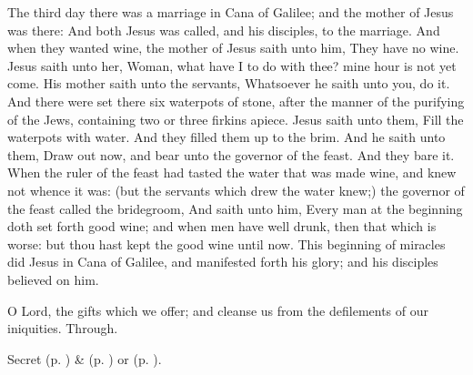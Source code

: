  The third day there was a marriage in Cana of Galilee; and the mother of Jesus was there: And both Jesus was called, and his disciples, to the marriage. And when they wanted wine, the mother of Jesus saith unto him, They have no wine. Jesus saith unto her, Woman, what have I to do with thee? mine hour is not yet come. His mother saith unto the servants, Whatsoever he saith unto you, do it. And there were set there six waterpots of stone, after the manner of the purifying of the Jews, containing two or three firkins apiece. Jesus saith unto them, Fill the waterpots with water. And they filled them up to the brim. And he saith unto them, Draw out now, and bear unto the governor of the feast. And they bare it. When the ruler of the feast had tasted the water that was made wine, and knew not whence it was: (but the servants which drew the water knew;) the governor of the feast called the bridegroom, And saith unto him, Every man at the beginning doth set forth good wine; and when men have well drunk, then that which is worse: but thou hast kept the good wine until now. This beginning of miracles did Jesus in Cana of Galilee, and manifested forth his glory; and his disciples believed on him.


\vspace{-0.4\baselineskip}

\secret\label{EpiphanyIISecret}

\vspace{-0.1\baselineskip}

 O Lord, the gifts which we offer; and cleanse us from the defilements of our iniquities. Through.


\begin{rubric}
     Secret  (p. \pageref{SPMaryPostChristmas}) \&   (p. \pageref{SPAgainst}) or  (p. \pageref{SPChiefBishop}).
\end{rubric}


